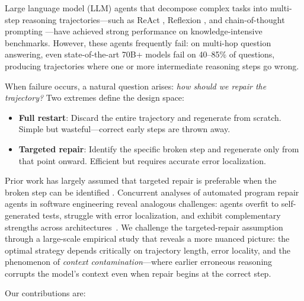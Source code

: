 \documentclass[letterpaper]{article}
\begin{document}
Large language model (LLM) agents that decompose complex tasks into multi-step reasoning trajectories---such as ReAct \citep{yao2023react}, Reflexion \citep{shinn2023reflexion}, and chain-of-thought prompting \citep{wei2022chain}---have achieved strong performance on knowledge-intensive benchmarks. However, these agents frequently fail: on multi-hop question answering, even state-of-the-art 70B+ models fail on 40--85\% of questions, producing trajectories where one or more intermediate reasoning steps go wrong.

When failure occurs, a natural question arises: \emph{how should we repair the trajectory?} Two extremes define the design space:

\begin{itemize}
  \item \textbf{Full restart}: Discard the entire trajectory and regenerate from scratch. Simple but wasteful---correct early steps are thrown away.
  \item \textbf{Targeted repair}: Identify the specific broken step and regenerate only from that point onward. Efficient but requires accurate error localization.
\end{itemize}

Prior work has largely assumed that targeted repair is preferable when the broken step can be identified \citep{madaan2023selfrefine, pan2024automatically}. Concurrent analyses of automated program repair agents in software engineering reveal analogous challenges: agents overfit to self-generated tests, struggle with error localization, and exhibit complementary strengths across architectures~\citep{ceka2026understanding}. We challenge the targeted-repair assumption through a large-scale empirical study that reveals a more nuanced picture: the optimal strategy depends critically on trajectory length, error locality, and the phenomenon of \emph{context contamination}---where earlier erroneous reasoning corrupts the model's context even when repair begins at the correct step.

Our contributions are:
\end{document}
